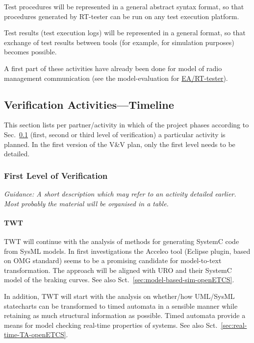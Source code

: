 \documentclass{template/openetcs_report}
\begin{document}
Test procedures will be represented in a general abstract syntax
format, so that procedures generated by RT-tester can be run on any
test execution platform.

Test results (test execution logs) will be represented in a general
format, so that exchange of test results between tools (for example,
for simulation purposes) becomes possible.



A first part of these activities have already been done for model of
radio management communication (see the model-evaluation for
\href{https://github.com/openETCS/model-evaluation/blob/master/model/EA-SysML/new_version/doc/ea_sysml_report.pdf}{EA/RT-tester}).

\subsection{Verification Activities---Timeline}
\label{sec:verif-activ-timel}

This section lists per partner/activity in which of the project
phases according to Sec.~\ref{sec:verif-activ-timel} (first, second or
third level of verification) a particular activity is planned. In the
first version of the V\&V plan, only the first level needs to be detailed.


\subsubsection{First Level of Verification}
\label{sec:first-level-verif}

\emph{Guidance: A short description which may refer to an activity
  detailed earlier. Most probably the material will be organised in a table.}

\paragraph{TWT}   
  TWT will continue with the analysis of methods for generating SystemC code from
  SysML models. In first investigations the Acceleo tool (Eclipse
  plugin, based on OMG standard) seems to be a promising candidate for
  model-to-text transformation. The approach will be aligned with URO and their SystemC model of the braking curves. 
  See also Sct.~\ref{sec:model-based-sim-openETCS}.

  In addition, TWT will start with the analysis on whether/how UML/SysML statecharts can be 
  transformed to timed automata in a sensible manner while retaining as
  much structural information as possible. Timed automata provide a means for model checking
  real-time properties of systems. See also Sct.~\ref{sec:real-time-TA-openETCS}.
\end{document}
